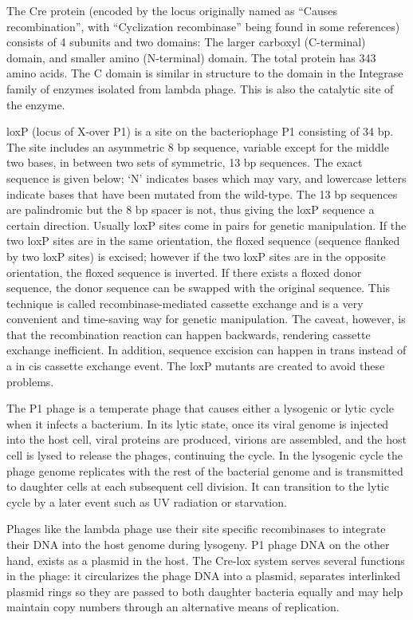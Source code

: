 The Cre protein (encoded by the locus originally named as ``Causes recombination'', with ``Cyclization recombinase'' being found in some references) consists of 4 subunits and two domains: The larger carboxyl (C-terminal) domain, and smaller amino (N-terminal) domain. The total protein has 343 amino acids. The C domain is similar in structure to the domain in the Integrase family of enzymes isolated from lambda phage. This is also the catalytic site of the enzyme.

loxP (locus of X-over P1) is a site on the bacteriophage P1 consisting of 34 bp. The site includes an asymmetric 8 bp sequence, variable except for the middle two bases, in between two sets of symmetric, 13 bp sequences. The exact sequence is given below; `N' indicates bases which may vary, and lowercase letters indicate bases that have been mutated from the wild-type. The 13 bp sequences are palindromic but the 8 bp spacer is not, thus giving the loxP sequence a certain direction. Usually loxP sites come in pairs for genetic manipulation. If the two loxP sites are in the same orientation, the floxed sequence (sequence flanked by two loxP sites) is excised; however if the two loxP sites are in the opposite orientation, the floxed sequence is inverted. If there exists a floxed donor sequence, the donor sequence can be swapped with the original sequence. This technique is called recombinase-mediated cassette exchange and is a very convenient and time-saving way for genetic manipulation. The caveat, however, is that the recombination reaction can happen backwards, rendering cassette exchange inefficient. In addition, sequence excision can happen in trans instead of a in cis cassette exchange event. The loxP mutants are created to avoid these problems.

The P1 phage is a temperate phage that causes either a lysogenic or lytic cycle when it infects a bacterium. In its lytic state, once its viral genome is injected into the host cell, viral proteins are produced, virions are assembled, and the host cell is lysed to release the phages, continuing the cycle. In the lysogenic cycle the phage genome replicates with the rest of the bacterial genome and is transmitted to daughter cells at each subsequent cell division. It can transition to the lytic cycle by a later event such as UV radiation or starvation.

Phages like the lambda phage use their site specific recombinases to integrate their DNA into the host genome during lysogeny. P1 phage DNA on the other hand, exists as a plasmid in the host. The Cre-lox system serves several functions in the phage: it circularizes the phage DNA into a plasmid, separates interlinked plasmid rings so they are passed to both daughter bacteria equally and may help maintain copy numbers through an alternative means of replication.

